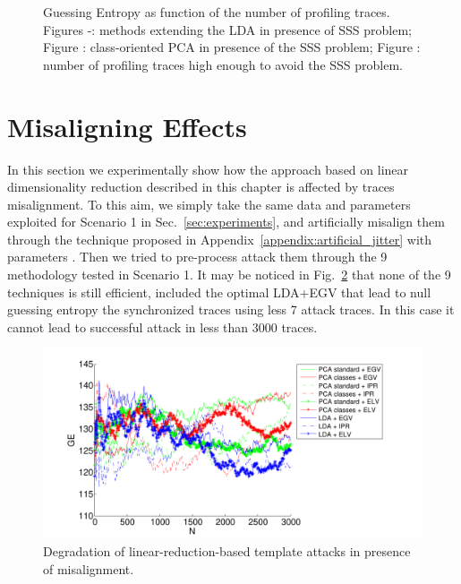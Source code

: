 \begin{figure}
\caption[Guessing Entropy as function of the number of profiling traces.]{Guessing Entropy as function of the number of profiling traces. Figures -: methods extending the LDA in presence of SSS problem; Figure : class-oriented PCA in presence of the SSS problem; Figure : number of profiling traces high enough to avoid the SSS problem.}\label{fig:scenario2}
\end{figure}

\section{Misaligning Effects}
In this section we experimentally show how the approach based on linear dimensionality reduction described in this chapter is affected by traces misalignment. To this aim, we simply take the same data and parameters exploited for Scenario 1 in Sec.~\ref{sec:experiments}, and artificially misalign them through the technique proposed in Appendix~\ref{appendix:artificial_jitter} with parameters . Then we tried to pre-process attack them through the 9 methodology tested in Scenario 1. It may be noticed in Fig.~\ref{fig:PCA_LDA_misalignment} that none of the 9 techniques is still efficient, included the optimal LDA+EGV that lead to null guessing entropy the synchronized traces using less 7 attack traces. In this case it cannot lead to successful attack in less than 3000 traces.
\begin{figure}
\includegraphics[width=\textwidth]{../Figures/desynchro_results_PCA_LDA.pdf} 
\caption{Degradation of linear-reduction-based template attacks in presence of misalignment.}\label{fig:PCA_LDA_misalignment}
\end{figure}